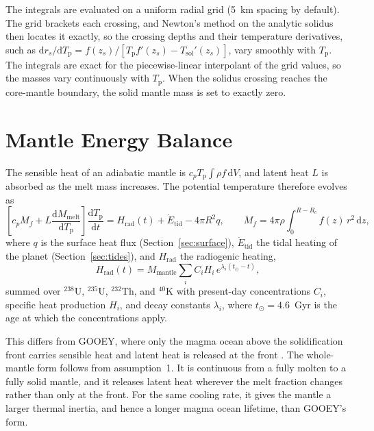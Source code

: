 \documentclass[11pt]{article}
\newcommand{\Tp}{T_\mathrm{p}}
\newcommand{\dd}{\mathrm{d}}
\begin{document}
The integrals are evaluated on a uniform radial grid (5~km spacing by default). The grid brackets each crossing, and Newton's method on the analytic solidus then locates it exactly, so the crossing depths and their temperature derivatives, such as $\dd r_s / \dd \Tp = f(z_s) / [\Tp f'(z_s) - T_\mathrm{sol}'(z_s)]$, vary smoothly with $\Tp$. The integrals are exact for the piecewise-linear interpolant of the grid values, so the masses vary continuously with $\Tp$. When the solidus crossing reaches the core-mantle boundary, the solid mantle mass is set to exactly zero.

\section{Mantle Energy Balance}\label{sec:energy}

The sensible heat of an adiabatic mantle is $c_p \Tp \int \rho f \, \dd V$, and latent heat $L$ is absorbed as the melt mass increases. The potential temperature therefore evolves as
\begin{equation}
\left[ c_p M_f + L \frac{\dd M_\mathrm{melt}}{\dd \Tp} \right] \frac{\dd \Tp}{\dd t}
= H_\mathrm{rad}(t) + \dot{E}_\mathrm{tid} - 4 \pi R^2 q,
\qquad M_f = 4 \pi \rho \int_0^{R - R_c} f(z) \, r^2 \, \dd z,
\label{eq:energy}
\end{equation}
where $q$ is the surface heat flux (Section~\ref{sec:surface}), $\dot{E}_\mathrm{tid}$ the tidal heating of the planet (Section~\ref{sec:tides}), and $H_\mathrm{rad}$ the radiogenic heating,
\begin{equation}
H_\mathrm{rad}(t) = M_\mathrm{mantle} \sum_i C_i H_i \, e^{\lambda_i (t_\odot - t)},
\end{equation}
summed over $^{238}$U, $^{235}$U, $^{232}$Th, and $^{40}$K with present-day concentrations $C_i$, specific heat production $H_i$, and decay constants $\lambda_i$, where $t_\odot = 4.6$~Gyr is the age at which the concentrations apply.

This differs from GOOEY, where only the magma ocean above the solidification front carries sensible heat and latent heat is released at the front \citep{Schaefer2016}. The whole-mantle form follows from assumption~1. It is continuous from a fully molten to a fully solid mantle, and it releases latent heat wherever the melt fraction changes rather than only at the front. For the same cooling rate, it gives the mantle a larger thermal inertia, and hence a longer magma ocean lifetime, than GOOEY's form.
\end{document}
